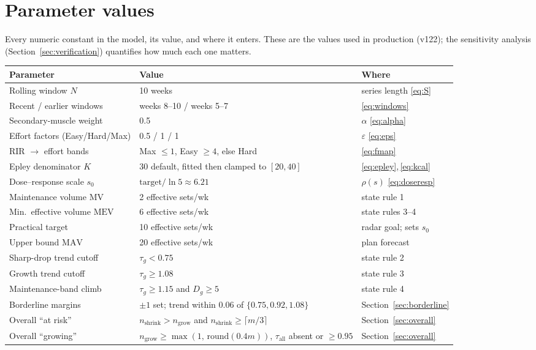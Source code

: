 \documentclass[11pt,a4paper]{article}
\newcommand{\eps}{\varepsilon}
\newcommand{\MV}{\mathrm{MV}}
\newcommand{\MEV}{\mathrm{MEV}}
\newcommand{\MAV}{\mathrm{MAV}}
\begin{document}
\section{Parameter values}
Every numeric constant in the model, its value, and where it enters. These are the values used in production (v122); the sensitivity analysis (Section~\ref{sec:verification}) quantifies how much each one matters.
\begin{center}
\small
\begin{tabular}{@{}p{5.2cm}p{4.7cm}p{4.3cm}@{}}
\toprule
\textbf{Parameter} & \textbf{Value} & \textbf{Where}\\
\midrule
Rolling window $N$ & 10 weeks & series length \eqref{eq:S}\\
Recent / earlier windows & weeks 8--10 / weeks 5--7 & \eqref{eq:windows}\\
Secondary-muscle weight & 0.5 & $\alpha$ \eqref{eq:alpha}\\
Effort factors (Easy/Hard/Max) & 0.5 / 1 / 1 & $\eps$ \eqref{eq:eps}\\
RIR $\to$ effort bands & Max ${\leq}1$, Easy ${\geq}4$, else Hard & \eqref{eq:fmap}\\
Epley denominator $K$ & 30 default, fitted then clamped to $[20,40]$ & \eqref{eq:epley},\,\eqref{eq:kcal}\\
Dose--response scale $s_0$ & $\text{target}/\ln 5 \approx 6.21$ & $\rho(s)$ \eqref{eq:doseresp}\\
Maintenance volume $\MV$ & 2 effective sets/wk & state rule 1\\
Min.\ effective volume $\MEV$ & 6 effective sets/wk & state rules 3--4\\
Practical target & 10 effective sets/wk & radar goal; sets $s_0$\\
Upper bound $\MAV$ & 20 effective sets/wk & plan forecast\\
Sharp-drop trend cutoff & $\tau_g < 0.75$ & state rule 2\\
Growth trend cutoff & $\tau_g \geq 1.08$ & state rule 3\\
Maintenance-band climb & $\tau_g \geq 1.15$ and $D_g \geq 5$ & state rule 4\\
Borderline margins & $\pm 1$ set; trend within 0.06 of $\{0.75, 0.92, 1.08\}$ & Section~\ref{sec:borderline}\\
Overall ``at risk'' & $n_{\text{shrink}} > n_{\text{grow}}$ and $n_{\text{shrink}} \geq \lceil m/3 \rceil$ & Section~\ref{sec:overall}\\
Overall ``growing'' & $n_{\text{grow}} \geq \max(1,\,\mathrm{round}(0.4m))$, $\tau_{\text{all}}$ absent or ${\geq}0.95$ & Section~\ref{sec:overall}\\

\end{tabular}
\end{center}
\end{document}
